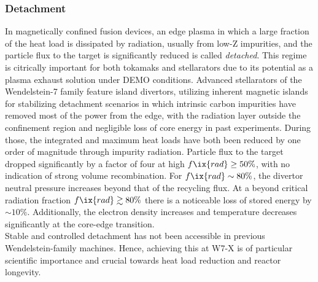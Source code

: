             \subsubsection*{Detachment}%
%
                In magnetically confined fusion devices, an edge plasma in which a large fraction of the heat load is dissipated by radiation, usually from low-Z impurities, and the particle flux to the target is significantly reduced is called \textit{detached}. This regime is citrically important for both tokamaks and stellarators due to its potential as a plasma exhaust solution under DEMO conditions. Advanced stellarators of the Wendelstein-7 family feature island divertors, utilizing inherent magnetic islands for stabilizing detachment scenarios in which intrinsic carbon impurities have removed most of the power from the edge, with the radiation layer outside the confinement region and negligible loss of core energy in past experiments. During those, the integrated and maximum heat loads have both been reduced by one order of magnitude through impurity radiation. Particle flux to the target dropped significantly by a factor of four at high $f\ix{rad}\ge50\%$, with no indication of strong volume recombination. For $f\ix{rad}\sim80\%$, the divertor neutral pressure increases beyond that of the recycling flux. At a beyond critical radiation fraction $f\ix{rad}\gtrsim80\%$ there is a noticeable loss of stored energy by $\sim10\%$. Additionally, the electron density increases and temperature decreases significantly at the core-edge transition.\cite{Feng2021}\\%
                Stable and controlled detachment has not been accessible in previous Wendelstein-family machines. Hence, achieving this at W7-X is of particular scientific importance and crucial towards heat load reduction and reactor longevity.%
%